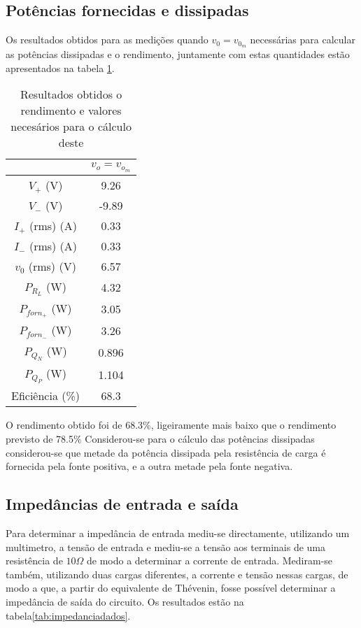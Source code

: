 \documentclass[%
  reprint,
  nofootinbib,
  amsmath,amssymb,
  aps,
  10pt,
  a4paper
]{revtex4-1}
\begin{document}
\subsection{Potências fornecidas e dissipadas}
Os resultados obtidos para as medições quando $v_0=v_{0_m}$ necessárias para calcular as potências dissipadas e o rendimento, juntamente com estas quantidades estão apresentados na tabela \ref{tab:fixe}.
\begin{table}[h]
\begin{tabular}{c|c}
                  & $v_{o}=v_{o_m}$ \\ \hline
$V_{+}$ (V)       & 9.26            \\ \hline
$V_{-}$ (V)       & -9.89           \\ \hline
$I_{+}$ (rms) (A) & 0.33            \\ \hline
$I_{-}$ (rms) (A) & 0.33            \\ \hline
$v_{0}$ (rms) (V) & 6.57            \\ \hline
$P_{R_L}$ (W)     & 4.32            \\ \hline
$P_{forn_+}$ (W)  & 3.05            \\ \hline
$P_{forn_-}$ (W)  & 3.26           \\ \hline
$P_{Q_N}$ (W)     & 0.896           \\ \hline
$P_{Q_P}$ (W)     & 1.104           \\ \hline
Eficiência (\%)   & 68.3          
\end{tabular}
\caption{Resultados obtidos o rendimento e valores necesários para o cálculo deste}
\label{tab:fixe}
\end{table}
O rendimento obtido foi de 68.3\%, ligeiramente mais baixo que o rendimento previsto de 78.5\%
Considerou-se para o cálculo das potências dissipadas considerou-se que metade da potência dissipada pela resistência de carga é fornecida pela fonte positiva, e a outra metade pela fonte negativa.

\subsection{Impedâncias de entrada e saída}

Para determinar a impedância de entrada mediu-se directamente, utilizando um multimetro, a tensão de entrada e mediu-se a tensão aos terminais de uma resistência de $10 \Omega$ de modo a determinar a corrente de entrada. Mediram-se também, utilizando duas cargas diferentes, a corrente e tensão nessas cargas, de modo a que, a partir do equivalente de Thévenin, fosse possível determinar a impedância de saída do circuito. Os resultados estão na tabela\ref{tab:impedanciadados}.
\end{document}
